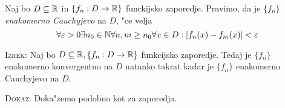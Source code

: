  Naj bo $D \subseteq \mathbb{R}$ in $\{ f_n : D \to \mathbb{R} \}$ funckijsko zaporedje. Pravimo, da je $\{ f_n \}$ \emph{enakomerno Cauchyjevo} na $D$, "ce velja
\begin{equation*}
\forall \varepsilon > 0 \exists n_0 \in \mathbb{N} \forall n, m \geq n_0 \forall x \in D : |f_n(x) - f_m(x)| < \varepsilon
\end{equation*}

\textsc{Izrek:} Naj bo $D \subseteq \mathbb{R}, \{f_n : D \to \mathbb{R} \}$ funkcijsko zaporedje. Tedaj je $\{ f_n \}$ enakomerno konvergentno na $D$ natanko takrat kadar je $\{ f_n \}$ enakomerno Cauchyjevo na $D$.

\textsc{Dokaz:} Doka"zemo podobno kot za zaporedja.
